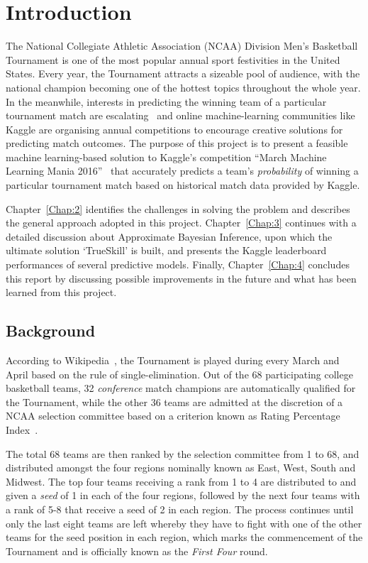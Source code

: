 \chapter{Introduction}
The National Collegiate Athletic Association (NCAA) Division  Men's Basketball Tournament is one of the most popular annual sport festivities in the United States. Every year, the Tournament attracts a sizeable pool of audience, with the national champion becoming one of the hottest topics throughout the whole year. In the meanwhile, interests in predicting the winning team of a particular tournament match are escalating~\cite{NP17} and online machine-learning communities like Kaggle are organising annual competitions to encourage creative solutions for predicting match outcomes. The purpose of this project is to present a feasible machine learning-based solution to Kaggle's competition ``March Machine Learning Mania 2016''~\cite{KG16} that accurately predicts a team's \emph{probability} of winning a particular tournament match based on historical match data provided by Kaggle. 

Chapter~\ref{Chap:2} identifies the challenges in solving the problem and describes the general approach adopted in this project. Chapter~\ref{Chap:3} continues with a detailed discussion about Approximate Bayesian Inference, upon which the ultimate solution `TrueSkill' is built, and presents the Kaggle leaderboard performances of several predictive models. Finally, Chapter~\ref{Chap:4} concludes this report by discussing possible improvements in the future and what has been learned from this project. 

\section{Background}
According to Wikipedia~\cite{NCAA17}, the Tournament is played during every March and April based on the rule of single-elimination. Out of the 68 participating college basketball teams, 32 \emph{conference} match champions are automatically qualified for the Tournament, while the other 36 teams are admitted at the discretion of a NCAA selection committee based on a criterion known as Rating Percentage Index~\cite{WIK17}.

The total 68 teams are then ranked by the selection committee from 1 to 68, and distributed amongst the four regions nominally known as East, West, South and Midwest. The top four teams receiving a rank from 1 to 4 are distributed to and given a \emph{seed} of 1 in each of the four regions, followed by the next four teams with a rank of 5-8 that receive a seed of 2 in each region. The process continues until only the last eight teams are left whereby they have to fight with one of the other teams for the  seed position in each region, which marks the commencement of the Tournament and is officially known as the \emph{First Four} round. 

